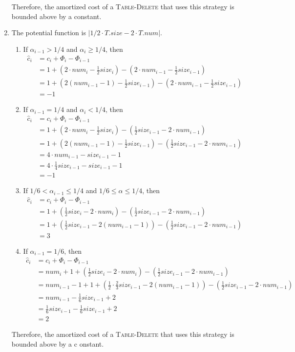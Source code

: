 \documentclass[12pt,letterpaper]{article}
\begin{document}
\begin{enumerate}
\begin{enumerate}
		\end{enumerate}
		Therefore, the amortized cost of a \textsc{Table-Delete} that uses this strategy is bounded above by a constant.
	\item
		The potential function is $|1/2\cdot T.size-2\cdot T.num|$.
		\begin{enumerate}
			\item If $\alpha_{i-1}>1/4$ and $\alpha_i\geq1/4$, then
				\begin{align*}
					\widehat{c}_i&=c_i+\Phi_i-\Phi_{i-1}\\
					&=1+(2\cdot num_i-\frac{1}{2}size_i)-(2\cdot num_{i-1}-\frac{1}{2}size_{i-1})\\
					&=1+(2(num_{i-1}-1)-\frac{1}{2}size_{i-1})-(2\cdot num_{i-1}-\frac{1}{2}size_{i-1})\\
					&=-1
				\end{align*}
			\item If $\alpha_{i-1}=1/4$ and $\alpha_i<1/4$, then
				\begin{align*}
					\widehat{c}_i&=c_i+\Phi_i-\Phi_{i-1}\\
					&=1+(2\cdot num_i-\frac{1}{2}size_i)-(\frac{1}{2}size_{i-1}-2\cdot num_{i-1})\\
					&=1+(2(num_{i-1}-1)-\frac{1}{2}size_{i-1})-(\frac{1}{2}size_{i-1}-2\cdot num_{i-1})\\
					&=4\cdot num_{i-1}-size_{i-1}-1\\
					&=4\cdot\frac{1}{4}size_{i-1}-size_{i-1}-1\\
					&=-1
				\end{align*}
			\item If $1/6<\alpha_{i-1}\leq1/4$ and $1/6\leq\alpha\leq1/4$, then
				\begin{align*}
					\widehat{c}_i&=c_i+\Phi_i-\Phi_{i-1}\\
					&=1+(\frac{1}{2}size_i-2\cdot num_i)-(\frac{1}{2}size_{i-1}-2\cdot num_{i-1})\\
					&=1+(\frac{1}{2}size_{i-1}-2(num_{i-1}-1))-(\frac{1}{2}size_{i-1}-2\cdot num_{i-1})\\
					&=3
				\end{align*}
			\item If $\alpha_{i-1}=1/6$, then
				\begin{align*}
					\widehat{c}_i&=c_i+\Phi_i-\Phi_{i-1}\\
					&=num_i+1+(\frac{1}{2}size_i-2\cdot num_i)-(\frac{1}{2}size_{i-1}-2\cdot num_{i-1})\\
					&=num_{i-1}-1+1+(\frac{1}{2}\cdot\frac{2}{3}size_{i-1}-2(num_{i-1}-1))-(\frac{1}{2}size_{i-1}-2\cdot num_{i-1})\\
					&=num_{i-1}-\frac{1}{6}size_{i-1}+2\\
					&=\frac{1}{6}size_{i-1}-\frac{1}{6}size_{i-1}+2\\
					&=2
				\end{align*}
		\end{enumerate}
		Therefore, the amortized cost of a \textsc{Table-Delete} that uses this strategy is bounded above by a c    onstant.
\end{enumerate}
\end{document}
